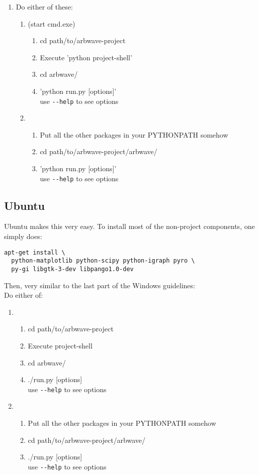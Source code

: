 \begin{enumerate}
  \item Do either of these:
    \begin{enumerate}
      \item  (start cmd.exe)
        \begin{enumerate}
          \item cd path/to/arbwave-project
          \item Execute 'python project-shell'
          \item cd arbwave/
          \item 'python run.py [options]'\\
            use \verb|--help| to see options
        \end{enumerate}
      \item
        \begin{enumerate}
          \item Put all the other packages in your PYTHONPATH somehow
          \item cd path/to/arbwave-project/arbwave/
          \item 'python run.py [options]'\\
            use \verb|--help| to see options
        \end{enumerate}
    \end{enumerate}
\end{enumerate}



\subsection{Ubuntu}
Ubuntu makes this very easy.  To install most of the non-project components, one
simply does:

\begin{verbatim}
apt-get install \
  python-matplotlib python-scipy python-igraph pyro \
  py-gi libgtk-3-dev libpango1.0-dev
\end{verbatim}


Then, very similar to the last part of the Windows guidelines: \\
Do either of:
\begin{enumerate}
  \item
    \begin{enumerate}
      \item cd path/to/arbwave-project
      \item Execute project-shell
      \item cd arbwave/
      \item ./run.py [options]\\
        use \verb|--help| to see options
    \end{enumerate}
  \item
    \begin{enumerate}
      \item Put all the other packages in your PYTHONPATH somehow
      \item cd path/to/arbwave-project/arbwave/
      \item ./run.py [options]\\
        use \verb|--help| to see options
    \end{enumerate}
\end{enumerate}
